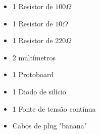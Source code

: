 \begin{itemize}
    \item 1 Resistor de $100\Omega$
    \item 1 Resistor de $10\Omega$
    \item 1 Resistor de $220\Omega$
    \item 2 multímetros
    \item 1 Protoboard
    \item 1 Diodo de silício
    \item 1 Fonte de tensão contínua
    \item Cabos de plug "banana"
\end{itemize}